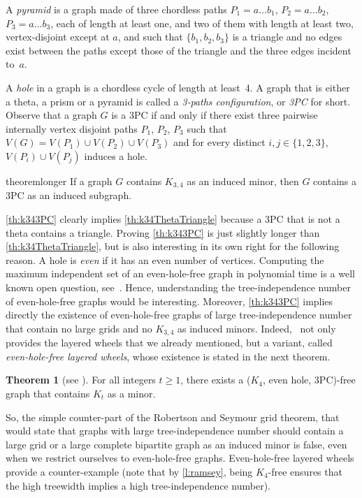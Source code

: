 \documentclass[11pt]{article}
\theoremstyle{definition}
\newtheorem{theorem}{Theorem}[section]
\theoremstyle{definition}
\begin{document}
A \emph{pyramid} is a graph made of three chordless paths
$P_1 = a \dots b_1$, $P_2 = a \dots b_2$, $P_3 = a \dots b_3$, each of
length at least one, and two of them with length at least two,
vertex-disjoint except at $a$, and such that $\{b_1,b_2,b_3\}$ is a
triangle and no edges exist between the paths except those of the
triangle and the three edges incident to~$a$.


A \emph{hole}
in a graph is a chordless cycle of length at least~4.
A graph that is either a theta, a prism or a pyramid is called a
\emph{3-paths configuration}, or \emph{3PC} for short.   Observe that
a graph $G$ is a 3PC if and only if there exist three pairwise
internally vertex disjoint paths $P_1$, $P_2$, $P_3$ such that $V(G) =
V(P_1) \cup V(P_2) \cup V(P_3)$ and for every distinct $i, j\in \{1, 2, 3\}$, $V(P_i) \cup V(P_j)$ induces a hole. 

\begin{restatable}{theorem}{longer}
  \label{th:k343PC}
  If a graph $G$ contains $K_{3, 4}$ as an induced minor, then $G$
  contains a 3PC as an induced subgraph. 
\end{restatable}

\cref{th:k343PC} clearly implies \cref{th:k34ThetaTriangle} because a
3PC that is not a theta contains a triangle.  Proving \cref{th:k343PC}
is just slightly longer than \cref{th:k34ThetaTriangle}, but is also
interesting in its own right for the following reason.   A hole is \emph{even} if
it has an even number of vertices. Computing the
maximum independent set of an even-hole-free graph in polynomial time
is a well known open question, see~\cite{vuskovic:evensurvey}.  Hence, understanding the
tree-independence number of even-hole-free graphs would be
interesting. Moreover, \cref{th:k343PC} implies directly the existence of
even-hole-free graphs of large tree-independence number that contain
no large grids and no $K_{3, 4}$ as induced minors.
Indeed,~\cite{DBLP:journals/jgt/SintiariT21} not only provides the
layered wheels that we already mentioned, but a variant, called
\emph{even-hole-free layered wheels}, whose existence is stated in the next theorem.


\begin{theorem}[see \cite{DBLP:journals/jgt/SintiariT21}]
  \label{th:ehf-lw}
  For all integers $t\geq 1$, there exists a ($K_4$, even hole,
  3PC)-free graph that contains $K_t$ as a minor.
\end{theorem}


So, the simple counter-part of the Robertson and Seymour grid theorem,
that would state that graphs with large tree-independence number
should contain a large grid or a large complete bipartite graph as an
induced minor is false, even when we restrict ourselves to
even-hole-free graphs.  Even-hole-free layered wheels provide a
counter-example (note that by \cref{l:ramsey}, being $K_4$-free
ensures that the high treewidth implies a high tree-independence
number).
\end{document}
